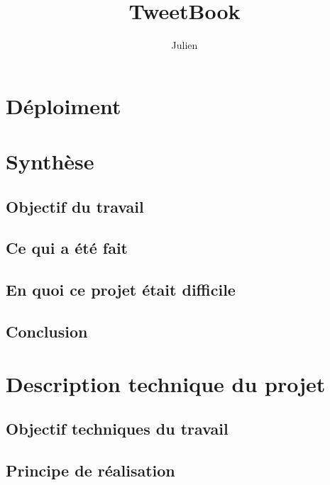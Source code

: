 \documentclass[12pt,a4paper]{report}
\title{\Huge TweetBook}
\author{Julien \bsc{Stechele}}
\date{}
\begin{document}
\maketitle
\newpage

\section{Déploiment}%
\label{sec:Déploiment}

\section{Synthèse}%
\label{sec:Synthèse}

  \subsection{Objectif du travail}
  \label{sub:Objectif du travail}

  \subsection{Ce qui a été fait}
  \label{sub:Ce qui a été fait}

  \subsection{En quoi ce projet était difficile}
  \label{sub:En quoi ce projet était difficile}

  \subsection{Conclusion}
  \label{sub:Conclusion}

\section{Description technique du projet}%
\label{sec:Description technique du projet}

  \subsection{Objectif techniques du travail}
  \label{sub:Objectif techniques du travail}

  \subsection{Principe de réalisation}
  \label{sub:Principe de réalisation}
\end{document}
